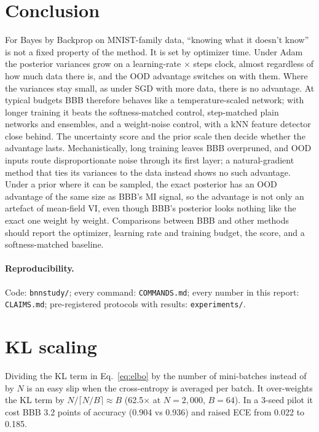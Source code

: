 \documentclass[11pt]{article}
\begin{document}
\section{Conclusion}
For Bayes by Backprop on MNIST-family data, ``knowing what it doesn't know''
is not a fixed property of the method. It is set by optimizer time. Under
Adam the posterior variances grow on a learning-rate $\times$ steps clock,
almost regardless of how much data there is, and the OOD advantage switches on
with them. Where the variances stay small, as under SGD with more data, there
is no advantage. At typical budgets BBB therefore behaves like a
temperature-scaled network; with longer training it beats the
softness-matched control, step-matched plain networks and ensembles, and a
weight-noise control, with a kNN feature detector close behind. The uncertainty score and the prior scale then decide whether
the advantage lasts. Mechanistically, long training leaves BBB overpruned, and
OOD inputs route disproportionate noise through its first layer; a
natural-gradient method that ties its variances to the data instead shows no
such advantage. Under a prior where it can be sampled, the exact
posterior has an OOD advantage of the same size as BBB's MI signal, so the
advantage is not only an artefact of mean-field VI, even though BBB's
posterior looks nothing like the exact one weight by weight. Comparisons between BBB and other methods should report
the optimizer, learning rate and training budget, the score, and a
softness-matched baseline.

\paragraph{Reproducibility.} Code: \texttt{bnnstudy/}; every command:
\texttt{COMMANDS.md}; every number in this report: \texttt{CLAIMS.md};
pre-registered protocols with results: \texttt{experiments/}.

\appendix
\section{KL scaling}\label{app:kl}
Dividing the KL term in Eq.~\ref{eq:elbo} by the number of mini-batches
instead of by $N$ is an easy slip when the cross-entropy is averaged per
batch. It over-weights the KL term by $N/\lceil N/B\rceil\approx B$ (62.5$\times$
at $N=2{,}000$, $B=64$). In a 3-seed pilot it cost BBB 3.2 points of accuracy
(0.904 vs 0.936) and raised ECE from 0.022 to 0.185.
\end{document}
